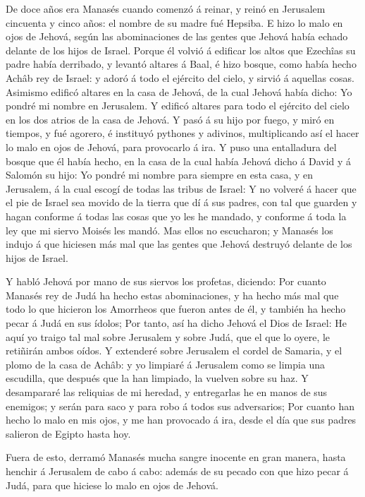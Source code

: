  De doce años era Manasés cuando comenzó á reinar, y reinó
en Jerusalem cincuenta y cinco años: el nombre de su madre fué Hepsiba.
 E hizo lo malo en ojos de Jehová, según las abominaciones
de las gentes que Jehová había echado delante de los hijos de Israel.
 Porque él volvió á edificar los altos que Ezechîas su padre
había derribado, y levantó altares á Baal, é hizo bosque, como había
hecho Achâb rey de Israel: y adoró á todo el ejército del cielo, y
sirvió á aquellas cosas.  Asimismo edificó altares en la
casa de Jehová, de la cual Jehová había dicho: Yo pondré mi nombre en
Jerusalem.  Y edificó altares para todo el ejército del
cielo en los dos atrios de la casa de Jehová.  Y pasó á su
hijo por fuego, y miró en tiempos, y fué agorero, é instituyó pythones y
adivinos, multiplicando así el hacer lo malo en ojos de Jehová, para
provocarlo á ira.  Y puso una entalladura del bosque que él
había hecho, en la casa de la cual había Jehová dicho á David y á
Salomón su hijo: Yo pondré mi nombre para siempre en esta casa, y en
Jerusalem, á la cual escogí de todas las tribus de Israel: 
Y no volveré á hacer que el pie de Israel sea movido de la tierra que dí
á sus padres, con tal que guarden y hagan conforme á todas las cosas que
yo les he mandado, y conforme á toda la ley que mi siervo Moisés les
mandó.  Mas ellos no escucharon; y Manasés los indujo á que
hiciesen más mal que las gentes que Jehová destruyó delante de los hijos
de Israel.

 Y habló Jehová por mano de sus siervos los profetas,
diciendo:  Por cuanto Manasés rey de Judá ha hecho estas
abominaciones, y ha hecho más mal que todo lo que hicieron los Amorrheos
que fueron antes de él, y también ha hecho pecar á Judá en sus ídolos;
 Por tanto, así ha dicho Jehová el Dios de Israel: He aquí
yo traigo tal mal sobre Jerusalem y sobre Judá, que el que lo oyere, le
retiñirán ambos oídos.  Y extenderé sobre Jerusalem el
cordel de Samaria, y el plomo de la casa de Achâb: y yo limpiaré á
Jerusalem como se limpia una escudilla, que después que la han limpiado,
la vuelven sobre su haz.  Y desampararé las reliquias de mi
heredad, y entregarlas he en manos de sus enemigos; y serán para saco y
para robo á todos sus adversarios;  Por cuanto han hecho lo
malo en mis ojos, y me han provocado á ira, desde el día que sus padres
salieron de Egipto hasta hoy.

 Fuera de esto, derramó Manasés mucha sangre inocente en
gran manera, hasta henchir á Jerusalem de cabo á cabo: además de su
pecado con que hizo pecar á Judá, para que hiciese lo malo en ojos de
Jehová.

